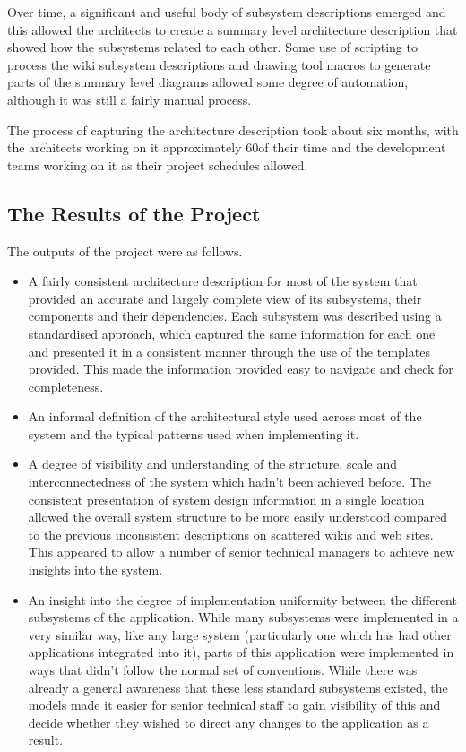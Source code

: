 \begin{itemise}
  Over time, a significant and useful body of subsystem descriptions emerged and this allowed the architects to create a summary level architecture description that showed how the subsystems related to each other.  Some use of scripting to process the wiki subsystem descriptions and drawing tool macros to generate parts of the summary level diagrams allowed some degree of automation, although it was still a fairly manual process.

   The process of capturing the architecture description took about six months, with the architects working on it approximately 60\percent of their time and the development teams working on it as their project schedules allowed.

\subsection{The Results of the Project}

  The outputs of the project were as follows.

\begin{itemize}
\item A fairly consistent architecture description for most of the system that provided an accurate and largely complete view of its subsystems, their components and their dependencies.  Each subsystem was described using a standardised approach, which captured the same information for each one and presented it in a consistent manner through the use of the templates provided.  This made the information provided easy to navigate and check for completeness.

\item An informal definition of the architectural style used across most of the system and the typical patterns used when implementing it.

\item A degree of visibility and understanding of the structure, scale and interconnectedness of the system which hadn't been achieved before.  The consistent presentation of system design information in a single location allowed the overall system structure to be more easily understood compared to the previous inconsistent descriptions on scattered wikis and web sites.  This appeared to allow a number of senior technical managers to achieve new insights into the system.

\item An insight into the degree of implementation uniformity between the different subsystems of the application.  While many subsystems were implemented in a very similar way, like any large system (particularly one which has had other applications integrated into it), parts of this application were implemented in ways that didn't follow the normal set of conventions.  While there was already a general awareness that these less standard subsystems existed, the models made it easier for senior technical staff to gain visibility of this and decide whether they wished to direct any changes to the application as a result.


\end{itemize}
\end{itemise}

